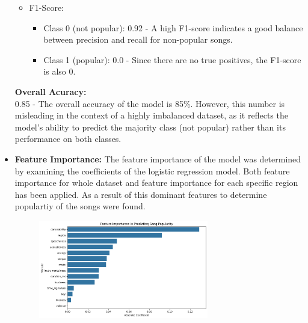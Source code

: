 \begin{itemize}
\begin{itemize}
\begin{itemize}
                \end{itemize}
            \item F1-Score:
                \begin{itemize}
                    \item Class 0 (not popular): 0.92 - A high F1-score indicates a good balance between precision and recall for non-popular songs.
                    \item Class 1 (popular): 0.0 - Since there are no true positives, the F1-score is also 0.
                \end{itemize}
        \end{itemize}
        \textbf{Overall Acuracy: } 
        \\
        0.85 - The overall accuracy of the model is 85\%. However, this number is misleading in the context of a highly imbalanced dataset, as it reflects the model's ability to predict the majority class (not popular) rather than its performance on both classes.
    \item \textbf{Feature Importance: } The feature importance of the model was determined by examining the coefficients of the logistic regression model. Both feature importance for whole dataset and feature importance for each specific region has been applied. As a result of this dominant features to determine populartiy of the songs were found.
        \begin{figure}[h] 
            \centering 
            \includegraphics[width=0.7\textwidth]{media/logistic_reg_feature_imp.png} 
        \end{figure}
        

\end{itemize}
